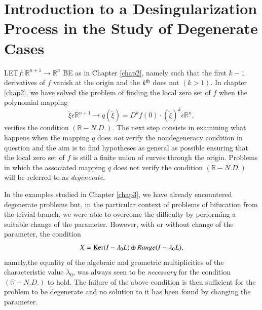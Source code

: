 
\chapter[Introduction to a Desingularization Process....]{Introduction to a Desingularization Process in the Study of
  Degenerate Cases}\label{chap5}

LET\pageoriginale $f: \mathbb{R}^{n+1} \to \mathbb{R}^{n}$ BE as in
Chapter \ref{chap2}, namely such that the first $k - 1$ derivatives of
$f$ vanish at the origin and the $k^{\rm th}$ does not $(k > 1)$. In chapter
\ref{chap2}, we have solved the problem of finding the local zero set
of $f$ when the polynomial mapping
$$
\widetilde{\xi} \epsilon \mathbb{R}^{n+1} \to q(\widetilde{\xi}) =
D^{k}f(0) \cdot (\widetilde{\xi})^{k} \epsilon \mathbb{R}^{n},
$$
verifies the condition $(\mathbb{R}-N.D.)$. The next step consists in
examining what happens when the mapping $q$ does {\em not} verify the
nondegeneracy condition in question and the aim is to find hypotheses
as general as possible ensuring that the local zero set of $f$ is still
a finite union of curves through the origin. Problems in which the
associated mapping $q$ does not verify the condition $(\mathbb{R} - N
. D.)$ will be referred to as {\em degenerate}.

In the examples studied in Chapter \ref{chap3}, we have already
encountered degenerate problems but, in the particular context of
problems of bifucation from the trivial branch, we were able to
overcome the difficulty by performing a suitable change of the
parameter. However, with or without change of the parameter, the
condition
$$
X = \operatorname{Ker} (I - \lambda_{0}L) \oplus Range (I - \lambda_{0}L), 
$$
namely,\pageoriginale the equality of the algebraic and geometric
multiplicities of the characteristic value $\lambda_{0}$, was always
seen to be {\em necessary} for the condition $(\mathbb{R}-N.D.)$ to
hold. The failure of the above condition is then sufficient for the
problem to be degenerate and no solution to it has been found by
changing the parameter.

